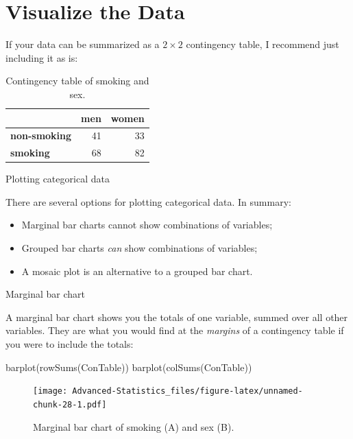 \documentclass[
]{book}
\newenvironment{Shaded}{\begin{snugshade}}{\end{snugshade}}
\newcommand{\FunctionTok}[1]{\textcolor[rgb]{0.00,0.00,0.00}{#1}}
\newcommand{\NormalTok}[1]{#1}
\providecommand{\tightlist}{%
  \setlength{\itemsep}{0pt}\setlength{\parskip}{0pt}}
\begin{document}
\hypertarget{vis-chi}{%
\section{Visualize the Data}\label{vis-chi}}

If your data can be summarized as a \(2 \times 2\) contingency table, I recommend just including it as is:

\begin{table}

\caption{\label{tab:unnamed-chunk-26}Contingency table of smoking and sex.}
\centering
\begin{tabular}[t]{>{}l|r|r}
\hline
  & men & women\\
\hline
\textbf{non-smoking} & 41 & 33\\
\hline
\textbf{smoking} & 68 & 82\\
\hline
\end{tabular}
\end{table}

Plotting categorical data

There are several options for plotting categorical data. In summary:

\begin{itemize}
\tightlist
\item
  Marginal bar charts cannot show combinations of variables;
\item
  Grouped bar charts \emph{can} show combinations of variables;
\item
  A mosaic plot is an alternative to a grouped bar chart.
\end{itemize}

Marginal bar chart

A marginal bar chart shows you the totals of one variable, summed over all other variables. They are what you would find at the \emph{margins} of a contingency table if you were to include the totals:

\begin{Shaded}
\begin{Highlighting}[]
\FunctionTok{barplot}\NormalTok{(}\FunctionTok{rowSums}\NormalTok{(ConTable))}
\FunctionTok{barplot}\NormalTok{(}\FunctionTok{colSums}\NormalTok{(ConTable))}
\end{Highlighting}
\end{Shaded}

\begin{figure}
\centering
\texttt{[image: Advanced-Statistics\_files/figure-latex/unnamed-chunk-28-1.pdf]}
\caption{\label{fig:unnamed-chunk-28}Marginal bar chart of smoking (A) and sex (B).}
\end{figure}
\end{document}
